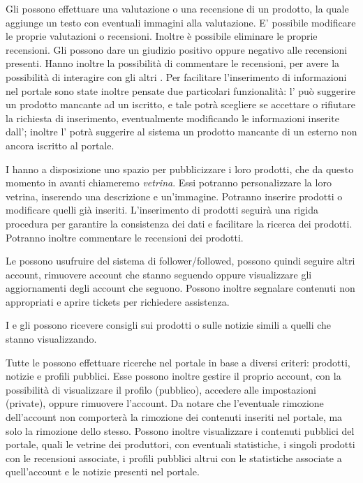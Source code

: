 Gli  possono effettuare una valutazione o una recensione di un prodotto, la quale aggiunge un testo con eventuali immagini alla valutazione. E' possibile modificare le proprie valutazioni o recensioni. Inoltre è possibile eliminare le proprie recensioni.
Gli  possono dare un giudizio positivo oppure negativo alle recensioni presenti. Hanno inoltre la possibilità di commentare le recensioni, per avere la possibilità di interagire con gli altri .
Per facilitare l'inserimento di informazioni nel portale sono state inoltre pensate due particolari funzionalità: l' può suggerire un prodotto mancante ad un  iscritto, e tale  potrà scegliere se accettare o rifiutare la richiesta di inserimento, eventualmente modificando le informazioni inserite dall'; inoltre l' potrà suggerire al sistema un prodotto mancante di un  esterno non ancora iscritto al portale.

I  hanno a disposizione uno spazio per pubblicizzare i loro prodotti, che da questo momento in avanti chiameremo \emph{vetrina}. Essi potranno personalizzare la loro vetrina, inserendo una descrizione e un'immagine. Potranno inserire prodotti o modificare quelli già inseriti. L'inserimento di prodotti seguirà una rigida procedura per garantire la consistenza dei dati e facilitare la ricerca dei prodotti. Potranno inoltre commentare le recensioni dei prodotti.

\bigskip
Le  possono usufruire del sistema di follower/followed, possono quindi seguire altri account, rimuovere account che stanno seguendo oppure visualizzare gli aggiornamenti degli account che seguono. Possono inoltre segnalare contenuti non appropriati e aprire tickets per richiedere assistenza.

I  e gli  possono ricevere consigli sui prodotti o sulle notizie simili a quelli che stanno visualizzando. 

Tutte le  possono effettuare ricerche nel portale in base a diversi criteri: prodotti, notizie e profili pubblici.
Esse possono inoltre gestire il proprio account, con la possibilità di visualizzare il profilo (pubblico), accedere alle impostazioni (private), oppure rimuovere l'account. Da notare che l'eventuale rimozione dell'account non comporterà la rimozione dei contenuti inseriti nel portale, ma solo la rimozione dello stesso. Possono inoltre visualizzare i contenuti pubblici del portale, quali le vetrine dei produttori, con eventuali statistiche, i singoli prodotti con le recensioni associate, i profili pubblici altrui con le statistiche associate a quell'account e le notizie presenti nel portale.

